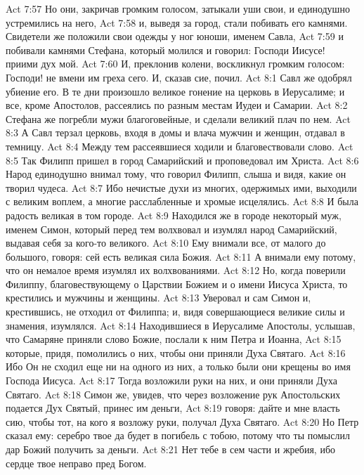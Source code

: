 \vs Act 7:57 Но они, закричав громким голосом, затыкали уши свои, и единодушно устремились на него,
\vs Act 7:58 и, выведя за город, стали побивать его камнями. Свидетели же положили свои одежды у ног юноши, именем Савла,
\vs Act 7:59 и побивали камнями Стефана, который молился и говорил: Господи Иисусе! приими дух мой.
\vs Act 7:60 И, преклонив колени, воскликнул громким голосом: Господи! не вмени им греха сего. И, сказав сие, почил.
\vs Act 8:1 Савл же одобрял убиение его. В те дни произошло великое гонение на церковь в Иерусалиме; и все, кроме Апостолов, рассеялись по разным местам Иудеи и Самарии.
\vs Act 8:2 Стефана же погребли мужи благоговейные, и сделали великий плач по нем.
\vs Act 8:3 А Савл терзал церковь, входя в домы и влача мужчин и женщин, отдавал в темницу.
\rsbpar\vs Act 8:4 Между тем рассеявшиеся ходили и благовествовали слово.
\vs Act 8:5 Так Филипп пришел в город Самарийский и проповедовал им Христа.
\vs Act 8:6 Народ единодушно внимал тому, что говорил Филипп, слыша и видя, какие он творил чудеса.
\vs Act 8:7 Ибо нечистые духи из многих, одержимых ими, выходили с великим воплем, а многие расслабленные и хромые исцелялись.
\vs Act 8:8 И была радость великая в том городе.
\rsbpar\vs Act 8:9 Находился же в городе некоторый муж, именем Симон, который перед тем волхвовал и изумлял народ Самарийский, выдавая себя за кого-то великого.
\vs Act 8:10 Ему внимали все, от малого до большого, говоря: сей есть великая сила Божия.
\vs Act 8:11 А внимали ему потому, что он немалое время изумлял их волхвованиями.
\vs Act 8:12 Но, когда поверили Филиппу, благовествующему о Царствии Божием и о имени Иисуса Христа, то крестились и мужчины и женщины.
\vs Act 8:13 Уверовал и сам Симон и, крестившись, не отходил от Филиппа; и, видя совершающиеся великие силы и знамения, изумлялся.
\rsbpar\vs Act 8:14 Находившиеся в Иерусалиме Апостолы, услышав, что Самаряне приняли слово Божие, послали к ним Петра и Иоанна,
\vs Act 8:15 которые, придя, помолились о них, чтобы они приняли Духа Святаго.
\vs Act 8:16 Ибо Он не сходил еще ни на одного из них, а только были они крещены во имя Господа Иисуса.
\vs Act 8:17 Тогда возложили руки на них, и они приняли Духа Святаго.
\vs Act 8:18 Симон же, увидев, что через возложение рук Апостольских подается Дух Святый, принес им деньги,
\vs Act 8:19 говоря: дайте и мне власть сию, чтобы тот, на кого я возложу руки, получал Духа Святаго.
\vs Act 8:20 Но Петр сказал ему: серебро твое да будет в погибель с тобою, потому что ты помыслил дар Божий получить за деньги.
\vs Act 8:21 Нет тебе в сем части и жребия, ибо сердце твое неправо пред Богом.
